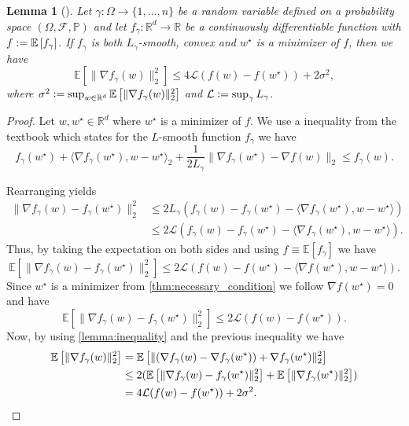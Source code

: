 \documentclass[12pt]{article}
\newtheorem{lemma}[lemma]{Lemma}
\theoremstyle{definition}
\numberwithin{equation}{section}
\newcommand{\R}{\mathbb{R}}
\newcommand{\BP}{\mathbb{P}}
\newcommand{\CF}{\mathcal{F}}
\newcommand{\CL}{\mathcal{L}}
\newcommand{\ev}[1]{\mathbb{E}\left[{#1}\right]}
\newcommand{\norm}[1]{\lVert{#1}\rVert_2}
\newcommand{\scp}[2]{\langle{#1}, {#2}\rangle_2}
\newcommand{\defeq}{\vcentcolon=}
\begin{document}
\begin{lemma}[]
  \label{lemma:gradient_inequality}
  Let $\gamma : \Omega \rightarrow \{1,\dots,n\}$ be a random variable defined on a probability space $(\Omega, \CF, \BP)$ and let $f_{\gamma} : \R^d \rightarrow \R$ be a continuously differentiable function with $f \defeq \ev{f_{\gamma}}$. If $f_{\gamma}$ is both $L_{\gamma}$-smooth, convex and $w^\star$ is a minimizer of $f$, then we have
  \begin{equation}
    \ev{\norm{\nabla f_{\gamma}(w)}^2} \leq 4 \CL (f(w) - f(w^\star)) + 2 \sigma^2,
  \end{equation}
  where $\sigma^2 \defeq \sup_{w \in \R^d} \ev{\norm{\nabla f_\gamma(w)}^2}$ and $\CL \defeq \sup_{\gamma} L_{\gamma}$.
\end{lemma}
\begin{proof}
  Let $w, w^\star \in \R^d$ where $w^\star$ is a minimizer of $f$. We use a inequality from the textbook \cite[pp.~67, (2.1.10)]{nesterovLecturesConvexOptimization2018} which states for the $L$-smooth function $f_\gamma$ we have
  \begin{equation*}
    f_\gamma(w^\star) + \scp{\nabla f_\gamma(w^\star)}{w - w^\star} + \frac{1}{2 L_\gamma}\norm{\nabla f_\gamma(w^\star) - \nabla f(w)} \leq f_\gamma(w).
  \end{equation*}
  
  Rearranging yields
  \begin{align*}
    \norm{\nabla f_{\gamma}(w) - f_{\gamma}(w^\star)}^2 &\leq 2L_{\gamma}(f_{\gamma}(w) - f_{\gamma}(w^\star) - \langle \nabla f_{\gamma}(w^\star), w - w^\star \rangle) \\
    &\leq 2\CL(f_{\gamma}(w) - f_{\gamma}(w^\star) - \langle \nabla f_{\gamma}(w^\star), w - w^\star \rangle).
  \end{align*}
  Thus, by taking the expectation on both sides and using $f \equiv \ev{f_\gamma}$ we have
  \begin{equation*}
    \ev{\norm{\nabla f_{\gamma}(w) - f_{\gamma}(w^\star)}^2 } \leq 2\CL(f(w) - f(w^\star) - \langle \nabla f(w^\star), w - w^\star \rangle).
  \end{equation*}
  Since $w^\star$ is a minimizer from \autoref{thm:necessary_condition} we follow $\nabla f(w^\star) = 0$ and have
  \begin{equation*}
    \ev{\norm{\nabla f_{\gamma}(w) - f_{\gamma}(w^\star)}^2 } \leq 2\CL(f(w) - f(w^\star)).
  \end{equation*}
  Now, by using \autoref{lemma:inequality} and the previous inequality we have
  \begin{align*}
    \ev{\norm{\nabla f_{\gamma}(w)}^2} &= \ev{\norm{(\nabla f_{\gamma}(w) - \nabla f_{\gamma}(w^\star)) + \nabla f_{\gamma}(w^\star)}^2} \\
    &\leq 2( \ev{\norm{\nabla f_{\gamma}(w) - f_{\gamma}(w^\star)}^2 } + \ev{\norm{\nabla f_{\gamma}(w^\star)}^2}) \\
    &= 4\CL(f(w) - f(w^\star)) + 2\sigma^2. \qedhere
  \end{align*}
\end{proof}
\end{document}
